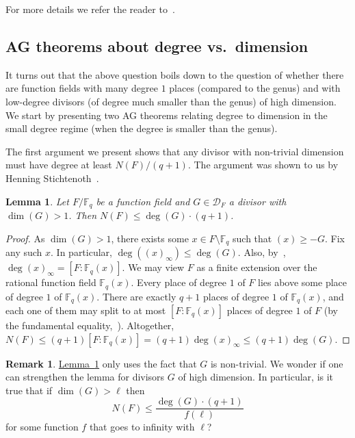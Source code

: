 \documentclass[10pt]{article}
\newtheorem{lemma}[theorem]{Lemma}
\theoremstyle{definition}
\newtheorem{remark}[theorem]{Remark}
\numberwithin{equation}{section}
\newcommand{\expref}[2]{\texorpdfstring{\hyperref[#2]{#1~\ref{#2}}}{#1~\ref{#2}}}
\newcommand{\cD}{\mathcal{D}}
\newcommand{\Fq}{{\mathbb{F}_q}}
\begin{document}
For more details we refer the reader to~\cite[Chapter III]{S:93}.

\subsection{AG theorems about degree vs.\ dimension}

It turns out that the above question boils down to the question of
whether there are function fields with many degree $1$ places
(compared to the genus) and with low-degree divisors (of degree much
smaller than the genus) of high dimension. We start by presenting
two AG theorems relating degree to dimension in the small degree
regime (when the degree is smaller than the genus).

The first argument we present shows that any divisor with
non-trivial dimension must have degree at least $N(F)/(q+1)$. The
argument was shown to us by Henning Stichtenoth~\cite{S:09}.

\begin{lemma}
\label{lem:henning} Let $F/\Fq $ be a function field and $G \in
\cD_F$ a divisor with $\dim(G) > 1$. Then $N(F) \le \deg(G) \cdot
(q+1)$.
\end{lemma}

\begin{proof}
As $\dim(G) > 1$, there exists some $x \in F \setminus \Fq$ such
that $(x) \ge -G$. Fix any such $x$. In particular,
$\deg((x)_\infty) \le \deg(G)$. Also, by~\cite[Thm I.4.11]{S:93},
$\deg(x)_\infty=[F:\Fq (x)]$. We may view $F$ as a finite extension
over the rational function field $\Fq (x)$. Every place of degree
$1$ of $F$ lies above some place of degree $1$ of $\Fq (x)$. There
are exactly $q+1$ places of degree $1$ of $\Fq (x)$, and each one of
them may split to at most $[F:\Fq (x)]$ places of degree $1$ of $F$
(by the fundamental equality,~\cite[Thm III.1.11]{S:93}).
Altogether, $N(F) \le (q+1) [F:\Fq (x)] = (q+1) \deg(x)_\infty \le
(q+1) \deg(G)$.
\end{proof}

\begin{remark}
\label{rem:henning} \expref{Lemma}{lem:henning} only uses the fact that
$G$ is non-trivial. We wonder if one can strengthen the lemma for
divisors $G$ of high dimension. In particular, is it true that if
$\dim(G) > \ell$ then
\[
N(F) \le \frac{\deg(G) \cdot (q+1)}{f(\ell)}
\]
for some function $f$ that goes to infinity with $\ell$?
\end{remark}

%
%
%
%
%
\end{document}
